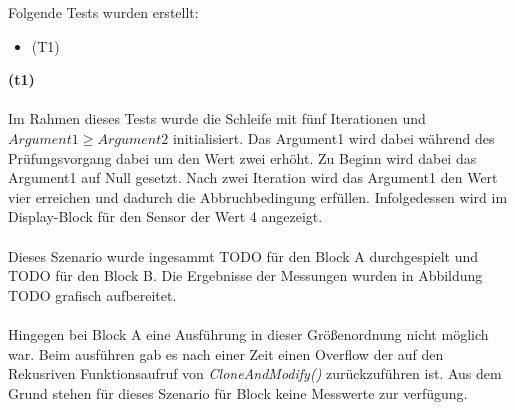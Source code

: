 \documentclass{article}
\begin{document}
    Folgende Tests wurden erstellt:
    \begin{itemize}
        \item (T1)
    \end{itemize}
    \textbf{(t1)}\\
    \\
    Im Rahmen dieses Tests wurde die Schleife mit fünf Iterationen und  $Argument1 \geq Argument2$ initialisiert.
    Das Argument1 wird dabei während des Prüfungsvorgang dabei um den Wert zwei erhöht.
    Zu Beginn wird dabei das Argument1 auf Null gesetzt.
    Nach zwei Iteration wird das Argument1 den Wert vier erreichen und dadurch die Abbruchbedingung erfüllen.
    Infolgedessen wird im Display-Block für den Sensor der Wert 4 angezeigt.\\
    \\
    Dieses Szenario wurde ingesammt TODO für den Block A durchgespielt und TODO für den Block B.
    Die Ergebnisse der Messungen wurden in Abbildung TODO grafisch aufbereitet.\\
    \\
    Hingegen bei Block A eine Ausführung in dieser Größenordnung nicht möglich war. 
    Beim ausführen gab es nach einer Zeit einen Overflow der auf den Rekusriven Funktionsaufruf von \textit{CloneAndModify()} zurückzuführen ist.
    Aus dem Grund stehen für dieses Szenario für Block keine Messwerte zur verfügung.
    \newpage
\end{document}

